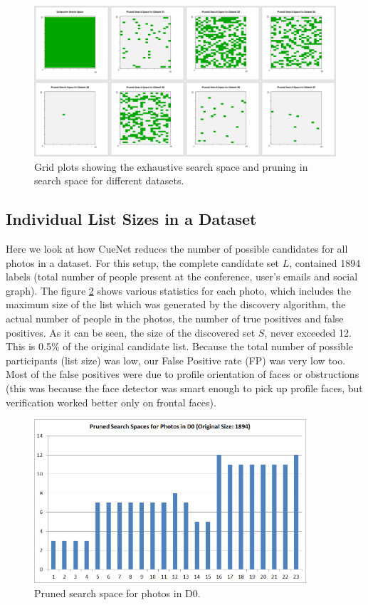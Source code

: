 \begin{figure}[t]
\centering
\includegraphics[width=\textwidth]{diversity/montage-clean-pruned-labelled.png}
\caption{Grid plots showing the exhaustive search space and pruning in search space for different datasets.}
\label{fig:diversity}
\end{figure}

\subsection{Individual List Sizes in a Dataset}
Here we look at how CueNet reduces the number of possible candidates for all photos in a dataset. For this setup, the complete candidate set $L$, contained 1894 labels (total number of people present at the conference, user's emails and social graph). The figure \ref{fig:exp-vldb-all-cx} shows various statistics for each photo, which includes the maximum size of the list which was generated by the discovery algorithm, the actual number of people in the photos, the number of true positives and false positives. As it can be seen, the size of the discovered set $S$, never exceeded 12. This is 0.5\% of the original candidate list. Because the total number of possible participants (list size) was low, our False Positive rate (FP) was very low too. Most of the false positives were due to profile orientation of faces or obstructions (this was because the face detector was smart enough to pick up profile faces, but verification worked better only on frontal faces).

\begin{figure}[t]
\centering
\includegraphics[width=0.9\textwidth]{media/reduced-list-sizes-d0.png}
\caption{Pruned search space for photos in D0.}
\label{fig:exp-vldb-all-cx}
\end{figure}

